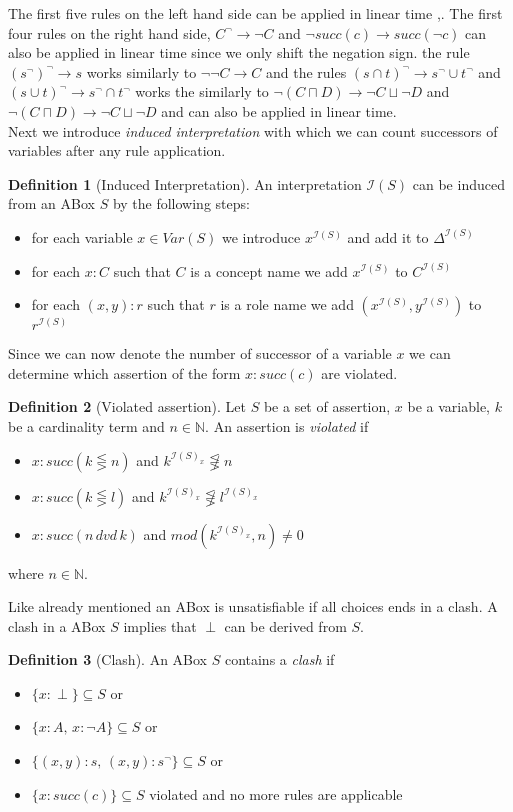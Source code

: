\documentclass[a4paper,11pt]{scrartcl}
\theoremstyle{break}
\theoremstyle{definition}
\newtheorem{mydef}{Definition}
\begin{document}
The first five rules on the left hand side can be applied in linear time \cite{1},\cite{6}. The first four rules on the right hand side, $C^\neg\rightarrow \neg C$ and $\neg succ(c)\rightarrow succ(\neg c)$ can also be applied in linear time since we only shift the negation sign. the rule $(s^\neg)^\neg\rightarrow s$ works similarly to $\neg\neg C\rightarrow C$ and the rules $(s\cap t)^\neg\rightarrow s^\neg\cup t^\neg$ and $(s\cup t)^\neg\rightarrow s^\neg \cap t^\neg$ works the similarly to $\neg(C\sqcap D)\rightarrow \neg C\sqcup \neg D$ and $\neg(C\sqcap D)\rightarrow \neg C\sqcup \neg D$ and can also be applied in linear time.\\
Next we introduce \textit{induced interpretation} with which we can count successors of variables after any rule application.
\begin{mydef}[Induced Interpretation]
An interpretation $\mathcal{I}(S)$ can be induced from an ABox $S$ by the following steps:
\begin{itemize}
\item for each variable $x\in Var(S)$ we introduce $x^{\mathcal{I}(S)}$ and add it to $\Delta^{\mathcal{I}(S)}$
\item for each $x:C$ such that $C$ is a concept name we add $x^{\mathcal{I}(S)}$ to $C^{\mathcal{I}(S)}$
\item for each $(x,y):r$ such that $r$ is a role name we add $(x^{\mathcal{I}(S)},y^{\mathcal{I}(S)})$ to $r^{\mathcal{I}(S)}$
\end{itemize}
\end{mydef}
Since we can now denote the number of successor of a variable $x$ we can determine which assertion of the form $x:succ(c)$ are violated.
\begin{mydef}[Violated assertion]
Let $S$ be a set of assertion, $x$ be a variable, $k$ be a cardinality term and $n\in\mathbb{N}$. An assertion is \textit{violated} if
\begin{itemize}
\item $x:succ(k\lesseqgtr n)$ and $k^{\mathcal{I}(S)_x}\not\lesseqgtr n$
\item $x:succ(k\lesseqgtr l)$ and $k^{\mathcal{I}(S)_x}\not\lesseqgtr l^{\mathcal{I}(S)_x}$
\item $x:succ(n\,dvd\,k)$ and $mod(k^{\mathcal{I}(S)_x},n)\neq 0$
\end{itemize} 
where $n\in\mathbb{N}$.
\end{mydef}
Like already mentioned an ABox is unsatisfiable if all choices ends in a clash. A clash in a ABox $S$ implies that $\perp$ can be derived from $S$.
\begin{mydef}[Clash]
An ABox $S$ contains a \textit{clash} if
\begin{itemize}
\item $\{x:\perp\}\subseteq S$ or
\item $\{x:A,\,x:\neg A\}\subseteq S$ or
\item $\{(x,y):s,\,(x,y):s^\neg\}\subseteq S$ or
\item $\{x:succ(c)\}\subseteq S$ violated and no more rules are applicable
\end{itemize}
\end{mydef}
\end{document}

